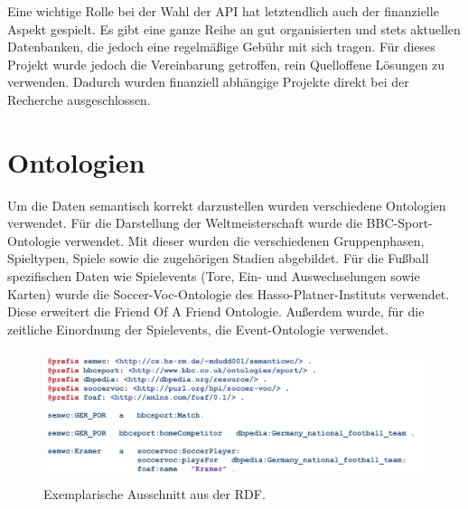 \documentclass[runningheads,a4paper]{llncs}
\begin{document}
Eine wichtige Rolle bei der Wahl der API hat letztendlich auch der finanzielle Aspekt gespielt. Es gibt eine ganze Reihe an gut organisierten und stets aktuellen Datenbanken, die jedoch eine regelmäßige Gebühr mit sich tragen. Für dieses Projekt wurde jedoch die Vereinbarung getroffen, rein Quelloffene Lösungen zu verwenden. Dadurch wurden finanziell abhängige Projekte direkt bei der Recherche ausgeschlossen. 
  
\section{Ontologien}
Um die Daten semantisch korrekt darzustellen wurden verschiedene Ontologien verwendet. Für die Darstellung der Weltmeisterschaft wurde die BBC-Sport-Ontologie verwendet. Mit dieser wurden die verschiedenen Gruppenphasen, Spieltypen, Spiele sowie die zugehörigen Stadien abgebildet. Für die Fußball spezifischen Daten wie Spielevents (Tore, Ein- und Auswechselungen sowie Karten) wurde die Soccer-Voc-Ontologie des Hasso-Platner-Instituts verwendet. Diese erweitert die Friend Of A Friend Ontologie. Außerdem wurde, für die zeitliche Einordnung der Spielevents, die Event-Ontologie verwendet.\\
 

\begin{figure}
\centering
\includegraphics[height=3.8cm]{turtle}
\caption{Exemplarische Ausschnitt aus der RDF.}
\label{fig:turtlerdf}
\end{figure}


\end{document}
